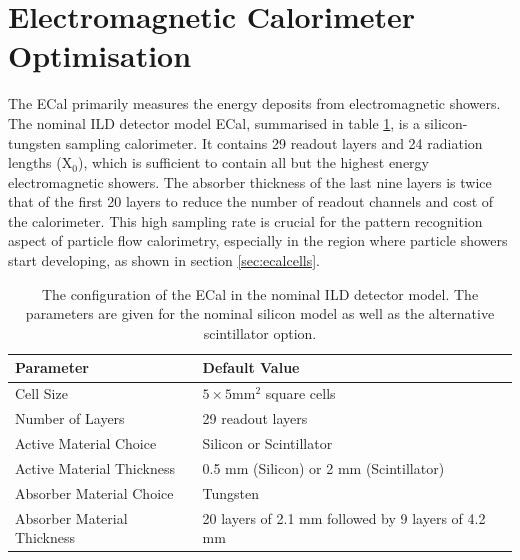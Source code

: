 
\section{Electromagnetic Calorimeter Optimisation}
\label{sec:ecal}
The ECal primarily measures the energy deposits from electromagnetic showers.  The nominal ILD detector model ECal, summarised in table \ref{table:defaultildecal}, is a silicon-tungsten sampling calorimeter.  It contains 29 readout layers and 24 radiation lengths ($\text{X}_{0}$), which is sufficient to contain all but the highest energy electromagnetic showers.  The absorber thickness of the last nine layers is twice that of the first 20 layers to reduce the number of readout channels and cost of the calorimeter.  This high sampling rate is crucial for the pattern recognition aspect of particle flow calorimetry, especially in the region where particle showers start developing, as shown in section \ref{sec:ecalcells}.  

\begin{table}[h!]
\centering
\begin{tabular}{ l l}
\hline
Parameter & Default Value \\
\hline
Cell Size & $5 \times 5 \text{mm}^{2}$ square cells \\
Number of Layers & 29 readout layers \\
Active Material Choice & Silicon or Scintillator  \\
Active Material Thickness & 0.5 mm (Silicon) or 2 mm (Scintillator)  \\
Absorber Material Choice & Tungsten \\
Absorber Material Thickness & 20 layers of 2.1 mm followed by 9 layers of 4.2 mm \\
\hline
\end{tabular}
\caption[The configuration of the ECal in the nominal ILD detector model.  The parameters are given for the nominal silicon model as well as the alternative scintillator option.]{The configuration of the ECal in the nominal ILD detector model.  The parameters are given for the nominal silicon model as well as the alternative scintillator option.}
\label{table:defaultildecal}
\end{table}


